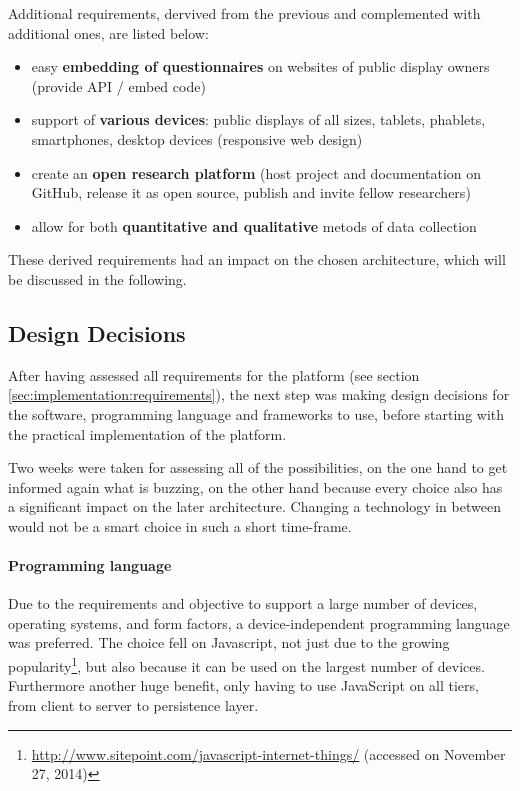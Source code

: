 	Additional requirements, dervived from the previous and complemented with additional ones, are listed below:

	\begin{itemize}[itemsep=0pt] 
	\item easy \textbf{embedding of questionnaires} on websites of public display owners (provide API / embed code)
	\item support of \textbf{various devices}: public displays of all sizes, tablets, phablets, smartphones, desktop devices (responsive web design)
	\item create an \textbf{open research platform} (host project and documentation on GitHub, release it as open source, publish and invite fellow researchers)
	\item allow for both \textbf{quantitative and qualitative} metods of data collection
	\end{itemize}


	These derived requirements had an impact on the chosen architecture, which will be discussed in the following.



\subsection{Design Decisions}
\label{sec:implementation:design-decisions}

	After having assessed all requirements for the platform (see section \ref{sec:implementation:requirements}), the next step was making design decisions for the software, programming language and frameworks to use, before starting with the practical implementation of the platform. 

	Two weeks were taken for assessing all of the possibilities, on the one hand to get informed again what is buzzing, on the other hand because every choice also has a significant impact on the later architecture. Changing a technology in between would not be a smart choice in such a short time-frame. 


	\paragraph{Programming language}

		Due to the requirements and objective to support a large number of devices, operating systems, and form factors, a device-independent programming language was preferred. 
		The choice fell on Javascript, not just due to the growing popularity\footnote{\url{http://www.sitepoint.com/javascript-internet-things/} (accessed on November 27, 2014)}, but also because it can be used on the largest number of devices. Furthermore another huge benefit, only having to use JavaScript on all tiers, from client to server to persistence layer.

